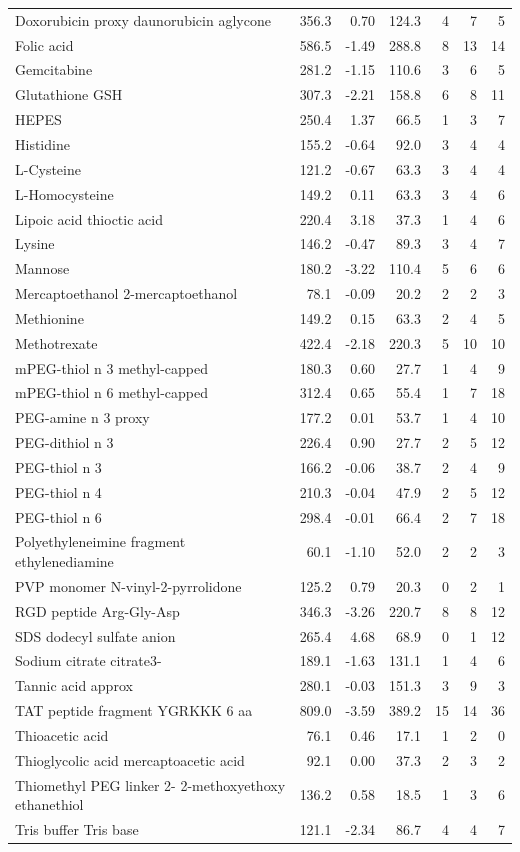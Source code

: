\documentclass[
  spanish,
  a4paper,
  12pt,
  oneside,
  openany]{memoir}
\begin{document}
\begin{longtable}{p{}rrrrrr}
Doxorubicin proxy daunorubicin aglycone & 356.3 & 0.70 & 124.3 & 4 & 7 & 5\\
Folic acid & 586.5 & -1.49 & 288.8 & 8 & 13 & 14\\
Gemcitabine & 281.2 & -1.15 & 110.6 & 3 & 6 & 5\\
Glutathione GSH & 307.3 & -2.21 & 158.8 & 6 & 8 & 11\\
HEPES & 250.4 & 1.37 & 66.5 & 1 & 3 & 7\\
Histidine & 155.2 & -0.64 & 92.0 & 3 & 4 & 4\\
L-Cysteine & 121.2 & -0.67 & 63.3 & 3 & 4 & 4\\
L-Homocysteine & 149.2 & 0.11 & 63.3 & 3 & 4 & 6\\
Lipoic acid thioctic acid & 220.4 & 3.18 & 37.3 & 1 & 4 & 6\\
Lysine & 146.2 & -0.47 & 89.3 & 3 & 4 & 7\\
Mannose & 180.2 & -3.22 & 110.4 & 5 & 6 & 6\\
Mercaptoethanol 2-mercaptoethanol & 78.1 & -0.09 & 20.2 & 2 & 2 & 3\\
Methionine & 149.2 & 0.15 & 63.3 & 2 & 4 & 5\\
Methotrexate & 422.4 & -2.18 & 220.3 & 5 & 10 & 10\\
mPEG-thiol n 3 methyl-capped & 180.3 & 0.60 & 27.7 & 1 & 4 & 9\\
mPEG-thiol n 6 methyl-capped & 312.4 & 0.65 & 55.4 & 1 & 7 & 18\\
PEG-amine n 3 proxy & 177.2 & 0.01 & 53.7 & 1 & 4 & 10\\
PEG-dithiol n 3 & 226.4 & 0.90 & 27.7 & 2 & 5 & 12\\
PEG-thiol n 3 & 166.2 & -0.06 & 38.7 & 2 & 4 & 9\\
PEG-thiol n 4 & 210.3 & -0.04 & 47.9 & 2 & 5 & 12\\
PEG-thiol n 6 & 298.4 & -0.01 & 66.4 & 2 & 7 & 18\\
Polyethyleneimine fragment ethylenediamine & 60.1 & -1.10 & 52.0 & 2 & 2 & 3\\
PVP monomer N-vinyl-2-pyrrolidone & 125.2 & 0.79 & 20.3 & 0 & 2 & 1\\
RGD peptide Arg-Gly-Asp & 346.3 & -3.26 & 220.7 & 8 & 8 & 12\\
SDS dodecyl sulfate anion & 265.4 & 4.68 & 68.9 & 0 & 1 & 12\\
Sodium citrate citrate3- & 189.1 & -1.63 & 131.1 & 1 & 4 & 6\\
Tannic acid approx & 280.1 & -0.03 & 151.3 & 3 & 9 & 3\\
TAT peptide fragment YGRKKK 6 aa & 809.0 & -3.59 & 389.2 & 15 & 14 & 36\\
Thioacetic acid & 76.1 & 0.46 & 17.1 & 1 & 2 & 0\\
Thioglycolic acid mercaptoacetic acid & 92.1 & 0.00 & 37.3 & 2 & 3 & 2\\
Thiomethyl PEG linker 2- 2-methoxyethoxy ethanethiol & 136.2 & 0.58 & 18.5 & 1 & 3 & 6\\
Tris buffer Tris base & 121.1 & -2.34 & 86.7 & 4 & 4 & 7\\
\bottomrule

\end{longtable}
\end{document}

